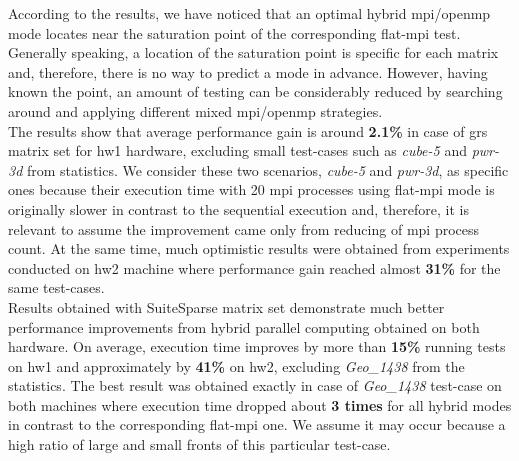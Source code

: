 

According to the results, we have noticed that an optimal hybrid \acrshort{mpi}/\acrshort{openmp} mode locates near the saturation point of the corresponding flat-\acrshort{mpi} test. Generally speaking, a location of the saturation point is specific for each matrix and, therefore, there is no way to predict a mode in advance. However, having known the point, an amount of testing can be considerably reduced by searching around and applying different mixed \acrshort{mpi}/\acrshort{openmp} strategies.\\


The results show that average performance gain is around \textbf{2.1\%} in case of \acrshort{grs} matrix set for \gls{hw1} hardware, excluding small test-cases such as \textit{cube-5} and \textit{pwr-3d} from statistics. We consider these two scenarios, \textit{cube-5} and \textit{pwr-3d}, as specific ones because their execution time with 20 \acrshort{mpi} processes using flat-\acrshort{mpi} mode is originally slower in contrast to the sequential execution and, therefore, it is relevant to assume the improvement came only from reducing of \acrshort{mpi} process count. At the same time, much optimistic results were obtained from experiments conducted on \gls{hw2} machine where performance gain reached almost \textbf{31\%} for the same test-cases.\\



Results obtained with SuiteSparse matrix set demonstrate much better performance improvements from hybrid parallel computing obtained on both hardware. On average, execution time improves by more than \textbf{15\%} running tests on \gls{hw1} and approximately by \textbf{41\%} on \gls{hw2}, excluding \textit{Geo\_1438} from the statistics. The best result was obtained exactly in case of \textit{Geo\_1438} test-case on both machines where execution time dropped about \textbf{3 times} for all hybrid modes in contrast to the corresponding flat-\acrshort{mpi} one. We assume it may occur because a high ratio of large and small fronts of this particular test-case.\\


